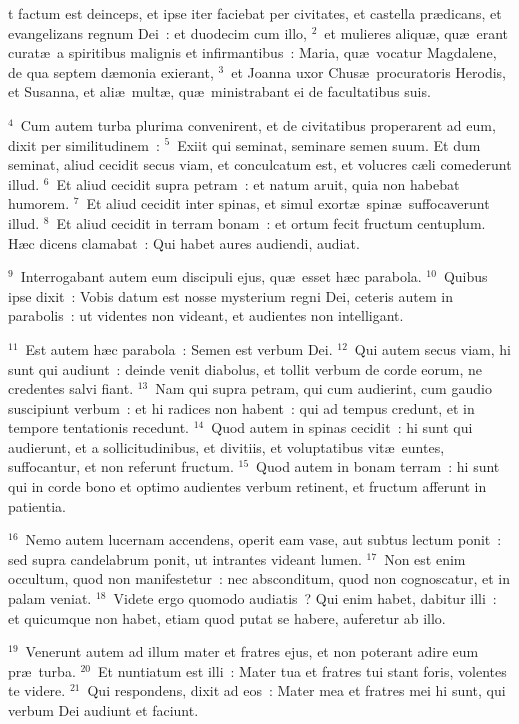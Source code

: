 \bchapter
{}t factum est deinceps, et ipse iter faciebat per civitates, et castella pr\ae dicans, et evangelizans regnum Dei~: et duodecim cum illo,
${}^{2}$~et mulieres aliqu\ae , qu\ae\ erant curat\ae\ a spiritibus malignis et infirmantibus~: Maria, qu\ae\ vocatur Magdalene, de qua septem d\ae monia exierant,
${}^{3}$~et Joanna uxor Chus\ae\ procuratoris Herodis, et Susanna, et ali\ae\ mult\ae , qu\ae\ ministrabant ei de facultatibus suis.


${}^{4}$~Cum autem turba plurima convenirent, et de civitatibus properarent ad eum, dixit per similitudinem~:
${}^{5}$~Exiit qui seminat, seminare semen suum. Et dum seminat, aliud cecidit secus viam, et conculcatum est, et volucres c\ae li comederunt illud.
${}^{6}$~Et aliud cecidit supra petram~: et natum aruit, quia non habebat humorem.
${}^{7}$~Et aliud cecidit inter spinas, et simul exort\ae\ spin\ae\ suffocaverunt illud.
${}^{8}$~Et aliud cecidit in terram bonam~: et ortum fecit fructum centuplum. H\ae c dicens clamabat~: Qui habet aures audiendi, audiat.


${}^{9}$~Interrogabant autem eum discipuli ejus, qu\ae\ esset h\ae c parabola.
${}^{10}$~Quibus ipse dixit~: Vobis datum est nosse mysterium regni Dei, ceteris autem in parabolis~: ut videntes non videant, et audientes non intelligant.


${}^{11}$~Est autem h\ae c parabola~: Semen est verbum Dei.
${}^{12}$~Qui autem secus viam, hi sunt qui audiunt~: deinde venit diabolus, et tollit verbum de corde eorum, ne credentes salvi fiant.
${}^{13}$~Nam qui supra petram, qui cum audierint, cum gaudio suscipiunt verbum~: et hi radices non habent~: qui ad tempus credunt, et in tempore tentationis recedunt.
${}^{14}$~Quod autem in spinas cecidit~: hi sunt qui audierunt, et a sollicitudinibus, et divitiis, et voluptatibus vit\ae\ euntes, suffocantur, et non referunt fructum.
${}^{15}$~Quod autem in bonam terram~: hi sunt qui in corde bono et optimo audientes verbum retinent, et fructum afferunt in patientia.


${}^{16}$~Nemo autem lucernam accendens, operit eam vase, aut subtus lectum ponit~: sed supra candelabrum ponit, ut intrantes videant lumen.
${}^{17}$~Non est enim occultum, quod non manifestetur~: nec absconditum, quod non cognoscatur, et in palam veniat.
${}^{18}$~Videte ergo quomodo audiatis~? Qui enim habet, dabitur illi~: et quicumque non habet, etiam quod putat se habere, auferetur ab illo.


${}^{19}$~Venerunt autem ad illum mater et fratres ejus, et non poterant adire eum pr\ae\ turba.
${}^{20}$~Et nuntiatum est illi~: Mater tua et fratres tui stant foris, volentes te videre.
${}^{21}$~Qui respondens, dixit ad eos~: Mater mea et fratres mei hi sunt, qui verbum Dei audiunt et faciunt.


